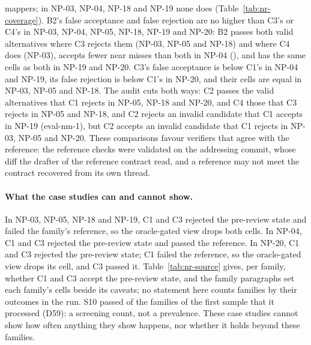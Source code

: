 mappers; in NP-03, NP-04, NP-18 and NP-19 none does (Table~\ref{tab:nr-coverage}). B2's false acceptance and false
rejection are no higher than C3's or C4's in NP-03, NP-04, NP-05, NP-18, NP-19 and NP-20: B2 passes both valid
alternatives where C3 rejects them (NP-03, NP-05 and NP-18) and where C4 does (NP-03), accepts fewer near misses than
both in NP-04 (), and has the same cells as both in NP-19 and NP-20. C3's false acceptance is below C1's
in NP-04 and NP-19, its false rejection is below C1's in NP-20, and their cells are equal in NP-03, NP-05 and NP-18. The
audit cuts both ways: C2 passes the valid alternatives that C1 rejects in NP-05, NP-18 and NP-20, and C4 those that C3
rejects in NP-05 and NP-18, and C2 rejects an invalid candidate that C1 accepts in NP-19 (eval-nm-1), but C2 accepts an
invalid candidate that C1 rejects in NP-03, NP-05 and NP-20. These comparisons favour verifiers that agree with the
reference: the reference checks were validated on the addressing commit, whose diff the drafter of the reference
contract read, and a reference may not meet the contract recovered from its own thread.

\paragraph{What the case studies can and cannot show.}
In NP-03, NP-05, NP-18 and NP-19, C1 and C3 rejected the pre-review state and failed the family's
reference, so the oracle-gated view drops both cells. In NP-04, C1 and C3 rejected the pre-review state and passed the
reference. In NP-20, C1 and C3 rejected the pre-review state; C1 failed the reference, so the oracle-gated view drops
its cell, and C3 passed it.
Table~\ref{tab:nr-source} gives, per family, whether C1 and C3 accept the pre-review state, and the family paragraphs
set each family's cells beside its caveats; no statement here counts families by their outcomes in the run. S10 passed
 of the  families of the first sample that it processed (D59): a
screening count, not a prevalence.
These case studies cannot show how often anything they show happens, nor whether it holds beyond these families.
